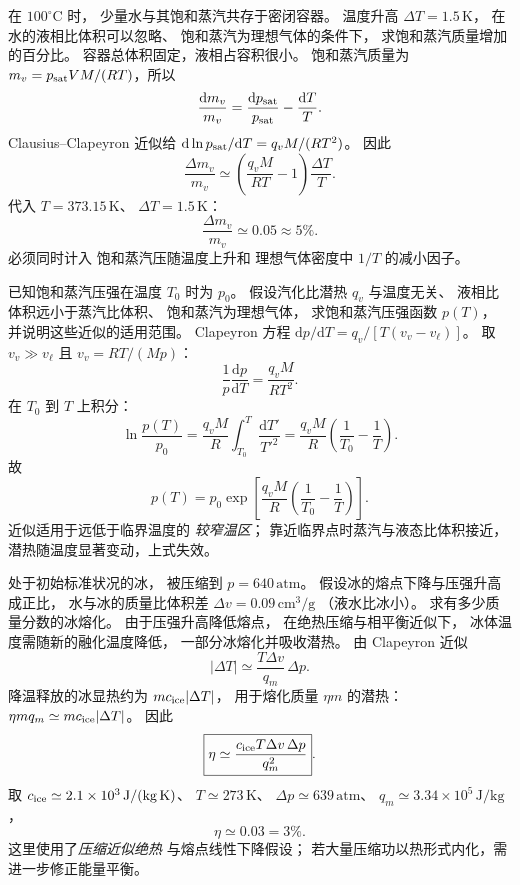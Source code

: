 在 $100^\circ\mathrm C$ 时，
少量水与其饱和蒸汽共存于密闭容器。
温度升高 $\Delta T=1.5\,\mathrm K$，
在水的液相比体积可以忽略、
饱和蒸汽为理想气体的条件下，
求饱和蒸汽质量增加的百分比。
\exsolution
容器总体积固定，液相占容积很小。
饱和蒸汽质量为
$m_v=p_{\rm sat}VM/(RT)$，所以
\[
\frac{\mathrm dm_v}{m_v}
=\frac{\mathrm dp_{\rm sat}}{p_{\rm sat}}
-\frac{\mathrm dT}{T}.
\]
Clausius--Clapeyron 近似给
$\mathrm d\ln p_{\rm sat}/\mathrm dT
=q_vM/(RT^2)$。
因此
\[
\frac{\Delta m_v}{m_v}
\simeq
\left(\frac{q_vM}{RT}-1\right)\frac{\Delta T}{T}.
\]
代入 $T=373.15\,\mathrm K$、
$\Delta T=1.5\,\mathrm K$：
\[
\boxed{\frac{\Delta m_v}{m_v}\simeq0.05
\approx5\%}.
\]
\excheck 必须同时计入
饱和蒸汽压随温度上升和
理想气体密度中 $1/T$ 的减小因子。

已知饱和蒸汽压强在温度 $T_0$ 时为 $p_0$。
假设汽化比潜热 $q_v$ 与温度无关、
液相比体积远小于蒸汽比体积、
饱和蒸汽为理想气体，
求饱和蒸汽压强函数 $p(T)$，
并说明这些近似的适用范围。
\exsolution
Clapeyron 方程
$\mathrm dp/\mathrm dT
=q_v/[T(v_v-v_\ell)]$。
取 $v_v\gg v_\ell$ 且
$v_v=RT/(Mp)$：
\[
\frac1p\frac{\mathrm dp}{\mathrm dT}
=\frac{q_vM}{RT^2}.
\]
在 $T_0$ 到 $T$ 上积分：
\[
\ln\frac{p(T)}{p_0}
=\frac{q_vM}{R}
\int_{T_0}^{T}\frac{\mathrm dT'}{T'^2}
=\frac{q_vM}{R}
\left(\frac1{T_0}-\frac1T\right).
\]
故
\[
\boxed{p(T)=p_0
\exp\left[\frac{q_vM}{R}
\left(\frac1{T_0}-\frac1T\right)\right]}.
\]
\excheck 近似适用于远低于临界温度的
\emph{较窄温区}；
靠近临界点时蒸汽与液态比体积接近，
潜热随温度显著变动，上式失效。

处于初始标准状况的冰，
被压缩到 $p=640\,\mathrm{atm}$。
假设冰的熔点下降与压强升高成正比，
水与冰的质量比体积差
$\Delta v=0.09\,\mathrm{cm^3/g}$
（液水比冰小）。
求有多少质量分数的冰熔化。
\exsolution
由于压强升高降低熔点，
在绝热压缩与相平衡近似下，
冰体温度需随新的融化温度降低，
一部分冰熔化并吸收潜热。
由 Clapeyron 近似
\[
|\Delta T|\simeq
\frac{T\Delta v}{q_m}\,\Delta p.
\]
降温释放的冰显热约为
$mc_{\rm ice}|\Delta T|$，
用于熔化质量 $\eta m$ 的潜热：
$\eta m q_m\simeq mc_{\rm ice}|\Delta T|$。
因此
\[
\boxed{\eta\simeq
\frac{c_{\rm ice}T\Delta v\,\Delta p}{q_m^2}}.
\]
取
$c_{\rm ice}\simeq2.1\times10^3\,\mathrm{J/(kg\,K)}$、
$T\simeq273\,\mathrm K$、
$\Delta p\simeq639\,\mathrm{atm}$、
$q_m\simeq3.34\times10^5\,\mathrm{J/kg}$，
\[
\boxed{\eta\simeq0.03=3\%}.
\]
\excheck 这里使用了\emph{压缩近似绝热}
与熔点线性下降假设；
若大量压缩功以热形式内化，需进一步修正能量平衡。

